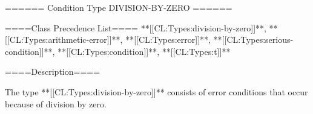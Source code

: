 ====== Condition Type DIVISION-BY-ZERO ======

====Class Precedence List==== **[[CL:Types:division-by-zero]]**, **[[CL:Types:arithmetic-error]]**, **[[CL:Types:error]]**, **[[CL:Types:serious-condition]]**, **[[CL:Types:condition]]**, **[[CL:Types:t]]**

====Description====

The type **[[CL:Types:division-by-zero]]** consists of error conditions that occur because of division by zero.

